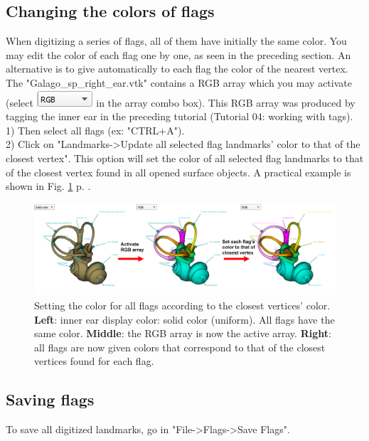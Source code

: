 \documentclass[12pt, a4paper]{book}
\begin{document}
\subsection{Changing the colors of flags}
When digitizing a series of flags, all of them have initially the same color. You may edit the color of each flag one by one, as seen in the preceding section. An alternative is to give automatically to each flag the color of the nearest vertex. The "Galago\_sp\_right\_ear.vtk" contains a RGB array which you may activate (select \includegraphics[scale=0.5]{../images/04/scalarcombo_rgb.png} in the array combo box). This RGB array was produced by tagging the inner ear in the preceding tutorial (Tutorial 04: working with tags). \\
1) Then select all flags (ex: "CTRL+A").\\
2) Click on "Landmarks->Update all selected flag landmarks' color to that of the closest vertex".
This option will set the color of all selected flag landmarks to that of the closest vertex found in all opened surface objects. A practical example is shown in Fig. \ref{flag_color_closest_vertex} p. \pageref{flag_color_closest_vertex}.

\begin{figure}
  \centering
  \includegraphics[scale=0.22]{edit_flag_color_closest_vertex.png} 
	\caption{Setting the color for all flags according to the closest vertices' color. \textbf{Left}: inner ear display color: solid color (uniform). All flags have the same color. \textbf{Middle}: the RGB array is now the active array. \textbf{Right}: all flags are now given colors that correspond to that of the closest vertices found for each flag.}
\label{flag_color_closest_vertex}
\end{figure}

\subsection{Saving flags}
To save all digitized landmarks, go in "File->Flags->Save Flags".
\end{document}
